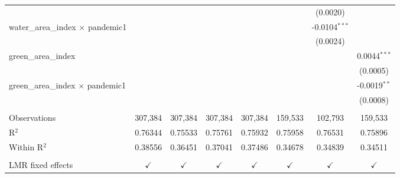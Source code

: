 \begin{table}[htbp]
\begin{threeparttable}[b]
\begin{tabular}{lccccccc}
                                                    &                         &                         &                         &                        &                         & (0.0020)                &   \\   
         water\_area\_index $\times$ pandemic1      &                         &                         &                         &                        &                         & -0.0104$^{***}$         &   \\   
                                                    &                         &                         &                         &                        &                         & (0.0024)                &   \\   
         green\_area\_index                         &                         &                         &                         &                        &                         &                         & 0.0044$^{***}$\\   
                                                    &                         &                         &                         &                        &                         &                         & (0.0005)\\   
         green\_area\_index $\times$ pandemic1      &                         &                         &                         &                        &                         &                         & -0.0019$^{**}$\\   
                                                    &                         &                         &                         &                        &                         &                         & (0.0008)\\   
          \\
         Observations                               & 307,384                 & 307,384                 & 307,384                 & 307,384                & 159,533                 & 102,793                 & 159,533\\  
         R$^2$                                      & 0.76344                 & 0.75533                 & 0.75761                 & 0.75932                & 0.75958                 & 0.76531                 & 0.75896\\  
         Within R$^2$                               & 0.38556                 & 0.36451                 & 0.37041                 & 0.37486                & 0.34678                 & 0.34839                 & 0.34511\\  
          \\
         LMR fixed effects                          & $\checkmark$            & $\checkmark$            & $\checkmark$            & $\checkmark$           & $\checkmark$            & $\checkmark$            & $\checkmark$\\   
         \bottomrule
      \end{tabular}
   \end{threeparttable}
\end{table}


